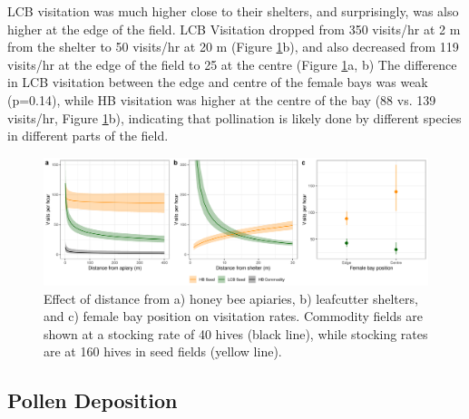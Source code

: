 \documentclass[12pt]{article} %
\begin{document}
LCB visitation was much higher close to their shelters, and surprisingly, was also higher at the edge of the field.
LCB Visitation dropped from 350 visits/hr at 2 m from the shelter to 50 visits/hr at 20 m (Figure \ref{fig:allVisits}b), and also decreased from 119 visits/hr at the edge of the field to 25 at the centre (Figure \ref{fig:allVisits}a, b)
The difference in LCB visitation between the edge and centre of the female bays was weak (p=0.14), while HB visitation was higher at the centre of the bay (88 vs. 139 visits/hr, Figure \ref{fig:allVisits}b), indicating that pollination is likely done by different species in different parts of the field.

\begin{figure}
    \centering
    \includegraphics[width=\textwidth,keepaspectratio=true]{../Figures/allVisits.png}
    \caption{Effect of distance from a) honey bee apiaries, b) leafcutter shelters, and c) female bay position on visitation rates. Commodity fields are shown at a stocking rate of 40 hives (black line), while stocking rates are at 160 hives in seed fields (yellow line).}
    \label{fig:allVisits}
\end{figure}

\subsection*{Pollen Deposition}
\end{document}
